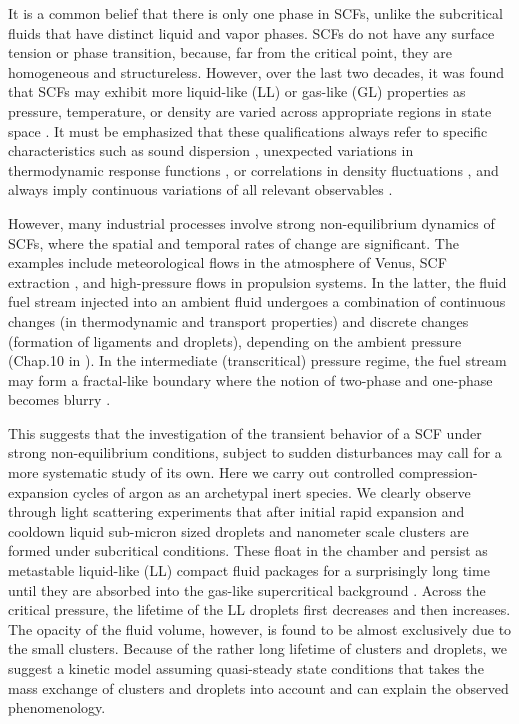 It is a common belief that there is only one phase in SCFs, unlike the subcritical fluids that have distinct liquid and vapor phases. SCFs do not have any surface tension or phase transition, because, far from the critical point, they are homogeneous and structureless. However, over the last two decades, it was found that SCFs may exhibit more liquid-like (LL) or gas-like (GL) properties as pressure, temperature, or density are varied across appropriate regions in state space \cite{simeoni2010widom, gorelli2006liquidlike, banuti2015crossing, maxim2019visualization, pipich2018densification, pipich2020polymorphic, prescher2017experimental, proctor2018liquid, bryk2017behavior}. It must be emphasized that these qualifications always refer to specific characteristics such as sound dispersion \cite{simeoni2010widom, gorelli2006liquidlike}, unexpected variations in thermodynamic response functions \cite{banuti2015crossing}, or correlations in density fluctuations \cite{ploetz2019gas}, and always imply continuous variations of all relevant observables \cite{schienbein2018investigation}.

However, many industrial processes involve strong non-equilibrium dynamics of SCFs, where the spatial and temporal rates of change are significant. The examples include meteorological flows in the atmosphere of Venus, SCF extraction \cite{taylor1996supercritical}, and high-pressure flows in propulsion systems. In the latter, the fluid fuel stream injected into an ambient fluid undergoes a combination of continuous changes (in thermodynamic and transport properties) and discrete changes (formation of ligaments and droplets), depending on the ambient pressure (Chap.10 in \cite{bellan2020high}). In the intermediate (transcritical) pressure regime, the fuel stream may form a fractal-like boundary where the notion of two-phase and one-phase becomes blurry \cite{harstad2000all}.

This suggests that the investigation of the transient behavior of a SCF under strong non-equilibrium conditions, subject to sudden disturbances may call for a more systematic study of its own. Here we carry out controlled compression-expansion cycles of argon as an archetypal inert species. We clearly observe through light scattering experiments that after initial rapid expansion and cooldown liquid sub-micron sized droplets and nanometer scale clusters are formed under subcritical conditions. These float in the chamber and persist as metastable liquid-like (LL) compact fluid packages for a surprisingly long time until they are absorbed into the gas-like supercritical background \cite{harstad2000all}. Across the critical pressure, the lifetime of the LL droplets first decreases and then increases. The opacity of the fluid volume, however, is found to be almost exclusively due to the small clusters. Because of the rather long lifetime of clusters and droplets, we suggest a kinetic model assuming quasi-steady state conditions that takes the mass exchange of clusters and droplets into account and can explain the observed phenomenology.



